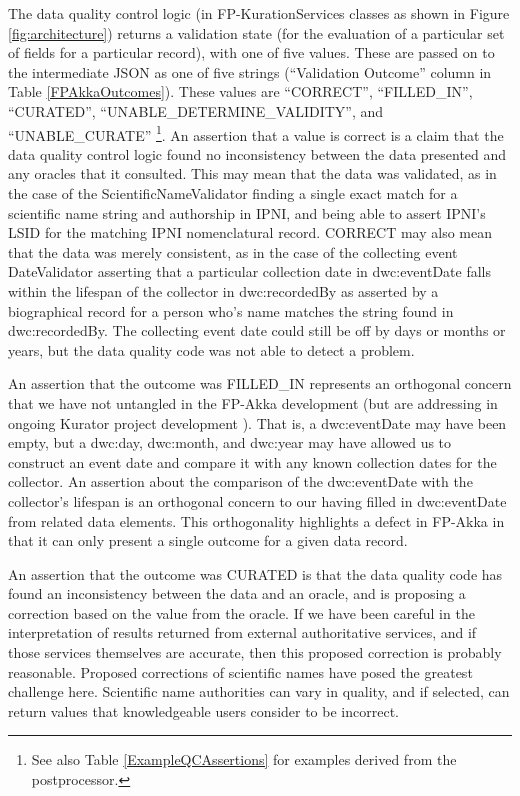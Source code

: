 \documentclass{article}
\begin{document}
The data quality control logic (in FP-KurationServices classes as shown in Figure \ref{fig:architecture}) returns a validation state (for the evaluation of a particular set of fields for a particular record), with one of five values.  These are passed on to the intermediate JSON as one of five strings (``Validation Outcome'' column in Table \ref{FPAkkaOutcomes}).  These values are “CORRECT”, “FILLED\_IN”, “CURATED”, “UNABLE\_DETERMINE\_VALIDITY”, and “UNABLE\_CURATE”
\footnote{See also Table \ref{ExampleQCAssertions} for examples derived from the postprocessor.}.
An assertion that a value is correct is a claim that the data quality control logic found no inconsistency between the data presented and any oracles that it consulted.  
This may mean that the data was validated, as in the case of the ScientificNameValidator finding a single exact match for a scientific name string and authorship in IPNI, and being able to assert IPNI's LSID for the matching IPNI nomenclatural record.
CORRECT may also mean that the data was merely consistent, as in the case of the collecting event DateValidator asserting that a particular collection date in dwc:eventDate falls within the lifespan of the collector in dwc:recordedBy as asserted by a biographical record for a person who's name matches the string found in dwc:recordedBy.  The collecting event date could still be off by days or months or years, but the data quality code was not able to detect a problem.

An assertion that the outcome was FILLED\_IN represents an orthogonal concern that we have not untangled in the FP-Akka development (but are addressing in ongoing Kurator project development \citep{Kurator_wiki_2016}).  That is, a dwc:eventDate may have been empty, but a dwc:day, dwc:month, and dwc:year may have allowed us to construct an event date and compare it with any known collection dates for the collector.  An assertion about the comparison of the dwc:eventDate with the collector's lifespan is an orthogonal concern to our having filled in dwc:eventDate from related data elements.  This orthogonality highlights a defect in FP-Akka in that it can only present a single outcome for a given data record. 

An assertion that the outcome was CURATED is that the data quality code has found an inconsistency between the data and an oracle, and is proposing a correction based on the value from the oracle.  If we have been careful in the interpretation of results returned from external authoritative services, and if those services themselves are accurate, then this proposed correction is probably reasonable.  Proposed corrections of scientific names have posed the greatest challenge here.  Scientific name authorities can vary in quality, and if selected, can return values that knowledgeable users consider to be incorrect. 
\end{document}
